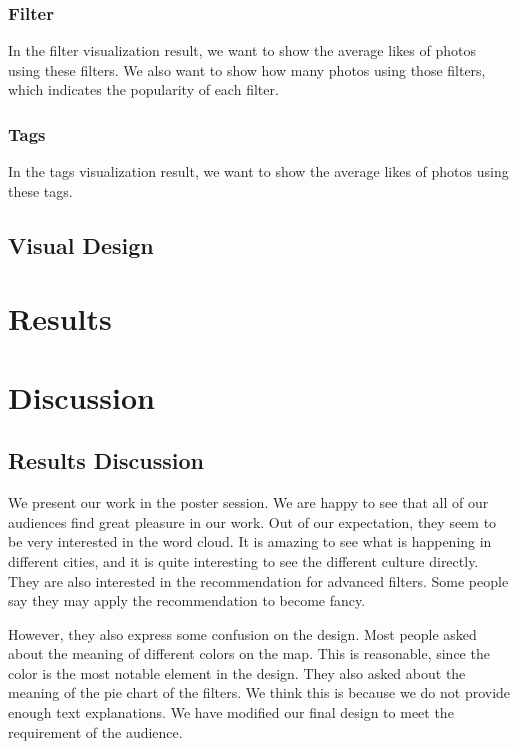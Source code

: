 \documentclass[conference]{acmsiggraph}
\begin{document}
\subsubsection{Filter}
In the filter visualization result, we want to show the average likes of photos using these filters. We also want to show how many photos using those filters, which indicates the popularity of each filter.

\subsubsection{Tags}
In the tags visualization result, we want to show the average likes of photos using these tags.

\subsection{Visual Design}

\section{Results}

\section{Discussion}

\subsection{Results Discussion}

We present our work in the poster session. We are happy to see that all of our audiences find great pleasure in our work. Out of our expectation, they seem to be very interested in the word cloud. It is amazing to see what is happening in different cities, and it is quite interesting to see the different culture directly. They are also interested in the recommendation for advanced filters. Some people say they may apply the recommendation to become fancy.


However, they also express some confusion on the  design. Most people asked about the meaning of different colors on the map. This is reasonable, since the color is the most notable element in the design. They also asked about the meaning of the pie chart of the filters. We think this is because we do not provide enough text explanations. We have modified our final design  to meet the requirement of the audience.
\end{document}
